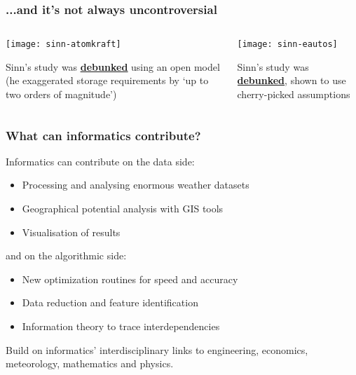 \documentclass[10pt,aspectratio=169,dvipsnames]{beamer}
\let\olditem\item
\renewcommand{\item}{%
\olditem\vspace{5pt}}
\begin{document}
\begin{frame}
  \frametitle{...and it's not always uncontroversial}

  \begin{columns}[T]
\begin{column}{6cm}
  \texttt{[image: sinn-atomkraft]}

    {\small Sinn's study was \href{https://doi.org/10.1016/j.euroecorev.2018.07.004}{\bf\color{blue}\underline{debunked}}
       using an
      open model (he exaggerated storage requirements by `up to
      \alert{two orders of magnitude}')}

\end{column}
\begin{column}{6cm}

  \texttt{[image: sinn-eautos]}

  {\small Sinn's study was \href{https://doi.org/10.1016/j.joule.2019.06.002}{\bf\color{blue}\underline{debunked}}, shown to use cherry-picked assumptions}
\end{column}
\end{columns}

\end{frame}



\begin{frame}[fragile]
  \frametitle{What can informatics contribute?}

  Informatics can contribute on the \alert{data side}:
  \begin{itemize}
  \item Processing and analysing enormous weather datasets
  \item Geographical potential analysis with GIS tools
  \item Visualisation of results
  \end{itemize}
  and on the \alert{algorithmic side}:
  \begin{itemize}
  \item New optimization routines for speed and accuracy
  \item Data reduction and feature identification
  \item Information theory to trace interdependencies
  \end{itemize}

  Build on informatics' \alert{interdisciplinary} links to engineering, economics, meteorology, mathematics and physics.
\end{frame}
\end{document}

